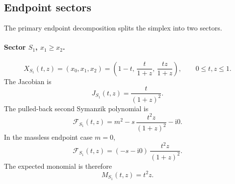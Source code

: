 \documentclass[11pt]{article}
\newcommand{\ii}{\mathrm i}
\newcommand{\F}{\mathcal F}
\begin{document}
\subsection{Endpoint sectors}

The primary endpoint decomposition splits the simplex into two sectors.

\paragraph{Sector \(S_1\), \(x_1\geq x_2\).}
\begin{equation}
  X_{S_1}(t,z)
  =
  (x_0,x_1,x_2)
  =
  \left(
    1-t,\,
    \frac{t}{1+z},\,
    \frac{tz}{1+z}
  \right),
  \qquad
  0\leq t,z\leq 1 .
\end{equation}
The Jacobian is
\begin{equation}
  J_{S_1}(t,z)=\frac{t}{(1+z)^2}.
\end{equation}
The pulled-back second Symanzik polynomial is
\begin{equation}
  \F_{S_1}(t,z)
  =
  m^2
  -
  s\,\frac{t^2z}{(1+z)^2}
  -
  \ii0 .
\end{equation}
In the massless endpoint case \(m=0\),
\begin{equation}
  \F_{S_1}(t,z)
  =
  (-s-\ii0)\,\frac{t^2z}{(1+z)^2}.
\end{equation}
The expected monomial is therefore
\begin{equation}
  M_{S_1}(t,z)=t^2z .
\end{equation}
\end{document}
